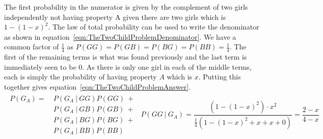 The first probability in the numerator is given by the complement of two girls independently not having property A given there are two girls which is $1 - (1 - x)^2$. The law of total probability can be used to write the denominator as shown in equation~\eqref{eqn:TheTwoChildProblemDenominator}. We have a common factor of $\frac{1}{4}$ as $P(GG) = P(GB) = P(BG) = P(BB) = \frac{1}{4}$. The first of the remaining terms is what was found previously and the last term is immediately seen to be 0. As there is only one girl in each of the middle terms, each is simply the probability of having property $A$ which is $x$. Putting this together gives equation~\eqref{eqn:TheTwoChildProblemAnswer}.
\begin{subequations}
	\begin{align}
		\begin{split}
			P(G_A) =\ &P(G_A\ |\ GG)P(GG)\ +  \\
			&P(G_A\ |\ GB)P(GB)\ +  \\
			&P(G_A\ |\ BG)P(BG)\ +  \\
			&P(G_A\ |\ BB)P(BB)
		\end{split}\label{eqn:TheTwoChildProblemDenominator}
	\end{align}
	\begin{equation}
		P(GG\ |\ G_A) = \frac{(1 - (1 - x)^2) \cdot x^2}{\frac{1}{4}(1 - (1 - x)^2 + x + x + 0)} = \frac{2 - x}{4 - x}
		\label{eqn:TheTwoChildProblemAnswer}
	\end{equation}
\end{subequations}
